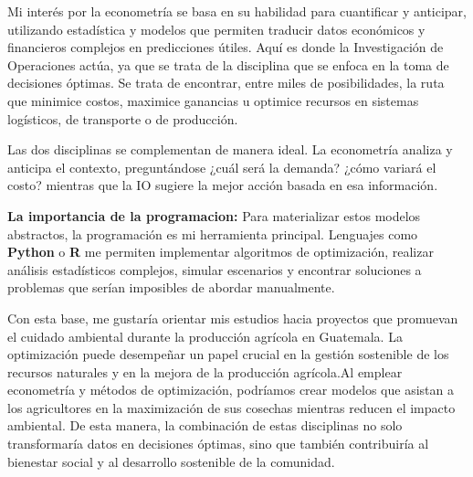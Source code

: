 \documentclass[12pt]{article}
\begin{document}
Mi interés por la econometría se basa en su habilidad para cuantificar y anticipar, utilizando estadística y modelos que permiten traducir datos económicos y financieros complejos en predicciones útiles. Aquí es donde la Investigación de Operaciones actúa,  ya que se trata de la disciplina que se enfoca en la toma de decisiones óptimas. Se trata de encontrar, entre miles de posibilidades, la ruta que minimice costos, maximice ganancias u optimice recursos en sistemas logísticos, de transporte o de producción.

Las dos disciplinas se complementan de manera ideal. La econometría analiza y anticipa el contexto, preguntándose ¿cuál será la demanda? ¿cómo variará el costo? mientras que la IO sugiere la mejor acción basada en esa información.

\textbf{La importancia de la programacion:} Para materializar estos modelos abstractos, la programación es mi herramienta principal. Lenguajes como \textbf{Python} o \textbf{R} me permiten implementar algoritmos de optimización, realizar análisis estadísticos complejos, simular escenarios y encontrar soluciones a problemas que serían imposibles de abordar manualmente.

Con esta base, me gustaría orientar mis estudios hacia proyectos que promuevan el cuidado ambiental durante la producción agrícola en Guatemala. La optimización puede desempeñar un papel crucial en la gestión sostenible de los recursos naturales y en la mejora de la producción agrícola.Al emplear econometría y métodos de optimización, podríamos crear modelos que asistan a los agricultores en la maximización de sus cosechas mientras reducen el impacto ambiental. De esta manera, la combinación de estas disciplinas no solo transformaría datos en decisiones óptimas, sino que también contribuiría al bienestar social y al desarrollo sostenible de la comunidad. 
\end{document}
